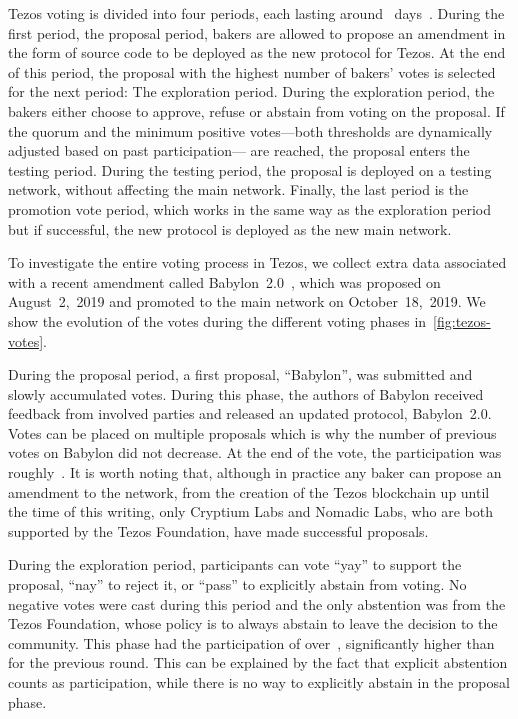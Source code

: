 Tezos voting is divided into four periods, each lasting around~ days~\cite{Goodman2014}. During the first period, the proposal period, bakers are allowed to propose an amendment in the form of source code to be deployed as the new protocol for Tezos.
At the end of this period, the proposal with the highest number of bakers' votes is selected for the next period: The exploration period. During the exploration period, the bakers either choose to approve, refuse or abstain from voting on the proposal. If the quorum and the minimum positive votes---both thresholds are dynamically adjusted based on past participation--- are reached, the proposal enters the testing period. During the testing period, the proposal is deployed on a testing network, without affecting the main network. Finally, the last period is the promotion vote period, which works in the same way as the exploration period but if successful, the new protocol is deployed as the new main network.

To investigate the entire voting process in Tezos, we collect extra data associated with a recent amendment called Babylon~2.0~\cite{CryptiumLabs2019}, which was proposed on August~2,~2019 and promoted to the main network on October~18,~2019.
We show the evolution of the votes during the different voting phases in~\autoref{fig:tezos-votes}.

During the proposal period, a first proposal, ``Babylon'', was submitted and slowly accumulated votes.
During this phase, the authors of Babylon received feedback from involved parties and released an updated protocol, Babylon~2.0. Votes can be placed on multiple proposals which is why the number of previous votes on Babylon did not decrease. At the end of the vote, the participation was roughly~. It is worth noting that, although in practice any baker can propose an amendment to the network, from the creation of the Tezos blockchain up until the time of this writing, only Cryptium Labs and Nomadic Labs, who are both supported by the Tezos Foundation, have made successful proposals.

During the exploration period, participants can vote ``yay'' to support the proposal, ``nay'' to reject it, or ``pass'' to explicitly abstain from voting. No negative votes were cast during this period and the only abstention was from the Tezos Foundation, whose policy is to always abstain to leave the decision to the community. This phase had the participation of over~, significantly higher than for the previous round. This can be explained by the fact that explicit abstention counts as participation, while there is no way to explicitly abstain in the proposal phase.

